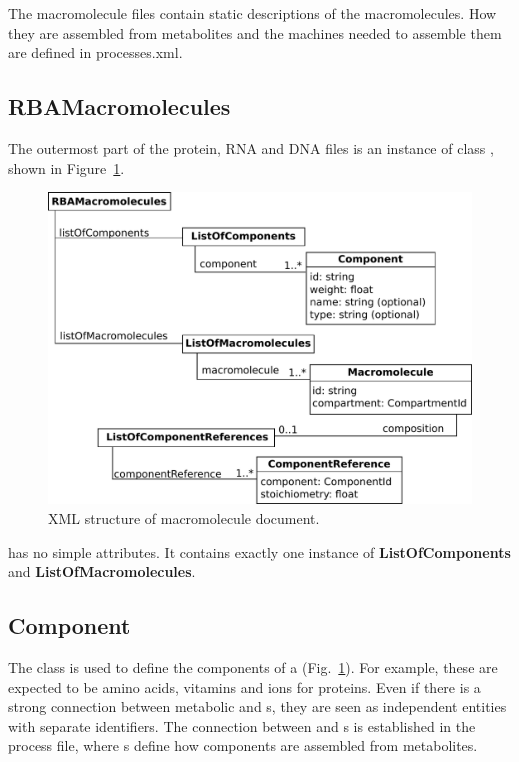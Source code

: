 The macromolecule files contain static descriptions of the macromolecules.
How they are assembled from metabolites and the machines needed to assemble
them are defined in processes.xml.

\subsection{RBAMacromolecules}
\label{sec:rba_macromolecules}

The outermost part of the protein, RNA and DNA files is an instance of class
\rbamacromolecules, shown in Figure~\ref{fig:macromolecules}.

\begin{figure}
  \centering
  \includegraphics[scale=0.8]{figures/macromolecules}
  \caption{XML structure of macromolecule document.}
\label{fig:macromolecules}
\end{figure}

\rbamacromolecules{} has no simple attributes.
It contains exactly one instance of \textbf{ListOfComponents}
and \textbf{ListOfMacromolecules}.


\subsection{Component}
\label{sec:component}

The \component{} class is used to define the components of a \macromolecule{}
(Fig.~\ref{fig:macromolecules}).
For example, these are expected to be amino acids, vitamins and ions for
proteins.
Even if there is a strong connection between metabolic \species{} and \component{}s,
they are seen as independent entities with separate identifiers.
The connection between \species{} and \component{}s is established in the process file,
where \processingmap{}s define how components are assembled from metabolites.


